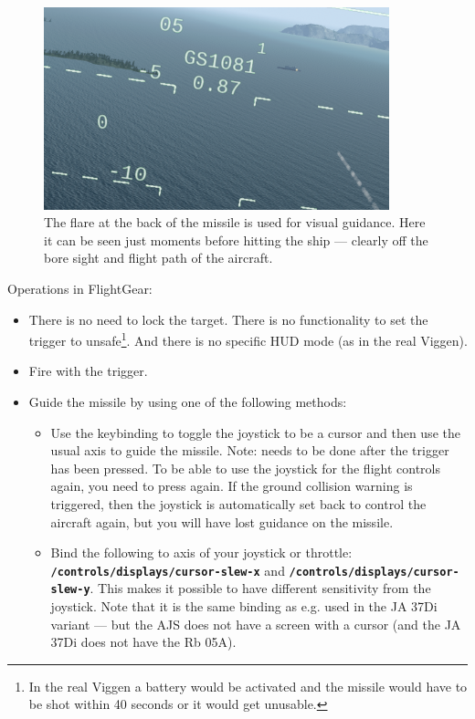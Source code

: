 \documentclass[a4paper]{report}
\begin{document}
{\begin{figure}[h]
\centering
 \includegraphics[width=10cm]{images/rb_05a_before_impact_ship.png}
 \caption[Flare at back of missile for guidance]{The flare at the back of the missile is used for visual guidance. Here it can be seen just moments before hitting the ship --- clearly off the bore sight and flight path of the aircraft.}
\end{figure}

Operations in FlightGear:
\begin{itemize}
 \item There is no need to lock the target. There is no functionality to set the trigger to unsafe\footnote{In the real Viggen a battery would be activated and the missile would have to be shot within 40 seconds or it would get unusable.}. And there is no specific HUD mode (as in the real Viggen).

 \item Fire with the trigger.
 \item Guide the missile by using one of the following methods:
 \begin{itemize}
  \item Use the keybinding  to toggle the joystick to be a cursor and then use the usual axis to guide the missile. Note: needs to be done after the trigger has been pressed. To be able to use the joystick for the flight controls again, you need to press  again. If the ground collision warning is triggered, then the joystick is automatically set back to control the aircraft again, but you will have lost guidance on the missile.
  \item Bind the following to axis of your joystick or throttle: \textbf{\texttt{/controls/displays/cursor-slew-x}} and \textbf{\texttt{/controls/displays/cursor-slew-y}}. This makes it possible to have different sensitivity from the joystick. Note that it is the same binding as e.g. used in the JA 37Di variant --- but the AJS does not have a screen with a cursor (and the JA 37Di does not have the Rb 05A).
 \end{itemize}


\end{itemize}}
\end{document}
